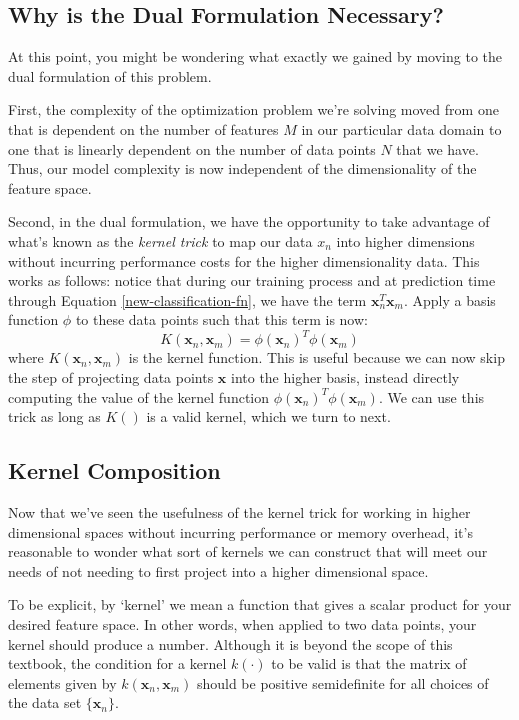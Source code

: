 \subsection{Why is the Dual Formulation Necessary?}
At this point, you might be wondering what exactly we gained by moving to the dual formulation of this problem.

First, the complexity of the optimization problem we're solving moved from one that is dependent on the number of features $M$ in our particular data domain to one that is linearly dependent on the number of data points $N$ that we have. Thus, our model complexity is now independent of the dimensionality of the feature space.

Second, in the dual formulation, we have the opportunity to take advantage of what's known as the \textit{kernel trick} to map our data $x_{n}$ into higher dimensions without incurring performance costs for the higher dimensionality data. This works as follows: notice that during our training process and at prediction time through Equation \ref{new-classification-fn}, we have the term $\textbf{x}_{n}^{T} \textbf{x}_{m}$. Apply a basis function $\phi$ to these data points such that this term is now:
\begin{equation} \label{kernel-fn}
	K(\textbf{x}_{n}, \textbf{x}_{m}) = \phi(\textbf{x}_{n})^{T} \phi(\textbf{x}_{m})
\end{equation}
where $K(\textbf{x}_{n}, \textbf{x}_{m})$ is the kernel function. This is useful because we can now skip the step of projecting data points $\textbf{x}$ into the higher basis, instead directly computing the value of the kernel function $\phi(\textbf{x}_{n})^{T} \phi(\textbf{x}_{m})$. We can use this trick as long as $K()$ is a valid kernel, which we turn to next.


\subsection{Kernel Composition}
Now that we've seen the usefulness of the kernel trick for working in higher dimensional spaces without incurring performance or memory overhead, it's reasonable to wonder what sort of kernels we can construct that will meet our needs of not needing to first project into a higher dimensional space.

To be explicit, by `kernel' we mean a function that gives a scalar product for your desired feature space. In other words, when applied to two data points, your kernel should produce a number. Although it is beyond the scope of this textbook, the condition for a kernel $k(\cdot)$ to be valid is that the matrix of elements given by $k(\textbf{x}_{n}, \textbf{x}_{m})$ should be positive semidefinite for all choices of the data set $\{ \textbf{x}_{n} \}$.

